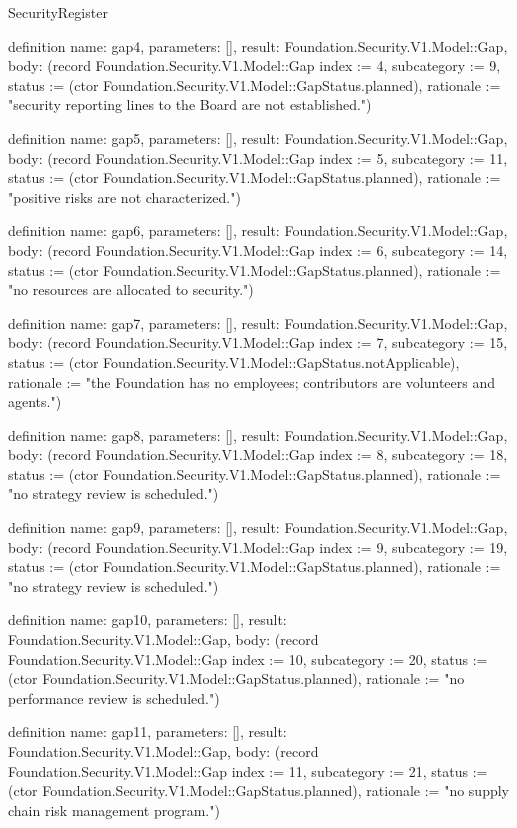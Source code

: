 \begin{lexlean}{SecurityRegister}
\begin{semanticmodule}
definition{
  name: gap4,
  parameters: [],
  result: Foundation.Security.V1.Model::Gap,
  body: (record Foundation.Security.V1.Model::Gap {index := 4, subcategory := 9, status := (ctor Foundation.Security.V1.Model::GapStatus.planned), rationale := "security reporting lines to the Board are not established."})
}

definition{
  name: gap5,
  parameters: [],
  result: Foundation.Security.V1.Model::Gap,
  body: (record Foundation.Security.V1.Model::Gap {index := 5, subcategory := 11, status := (ctor Foundation.Security.V1.Model::GapStatus.planned), rationale := "positive risks are not characterized."})
}

definition{
  name: gap6,
  parameters: [],
  result: Foundation.Security.V1.Model::Gap,
  body: (record Foundation.Security.V1.Model::Gap {index := 6, subcategory := 14, status := (ctor Foundation.Security.V1.Model::GapStatus.planned), rationale := "no resources are allocated to security."})
}

definition{
  name: gap7,
  parameters: [],
  result: Foundation.Security.V1.Model::Gap,
  body: (record Foundation.Security.V1.Model::Gap {index := 7, subcategory := 15, status := (ctor Foundation.Security.V1.Model::GapStatus.notApplicable), rationale := "the Foundation has no employees; contributors are volunteers and agents."})
}

definition{
  name: gap8,
  parameters: [],
  result: Foundation.Security.V1.Model::Gap,
  body: (record Foundation.Security.V1.Model::Gap {index := 8, subcategory := 18, status := (ctor Foundation.Security.V1.Model::GapStatus.planned), rationale := "no strategy review is scheduled."})
}

definition{
  name: gap9,
  parameters: [],
  result: Foundation.Security.V1.Model::Gap,
  body: (record Foundation.Security.V1.Model::Gap {index := 9, subcategory := 19, status := (ctor Foundation.Security.V1.Model::GapStatus.planned), rationale := "no strategy review is scheduled."})
}

definition{
  name: gap10,
  parameters: [],
  result: Foundation.Security.V1.Model::Gap,
  body: (record Foundation.Security.V1.Model::Gap {index := 10, subcategory := 20, status := (ctor Foundation.Security.V1.Model::GapStatus.planned), rationale := "no performance review is scheduled."})
}

definition{
  name: gap11,
  parameters: [],
  result: Foundation.Security.V1.Model::Gap,
  body: (record Foundation.Security.V1.Model::Gap {index := 11, subcategory := 21, status := (ctor Foundation.Security.V1.Model::GapStatus.planned), rationale := "no supply chain risk management program."})
}


\end{semanticmodule}
\end{lexlean}
